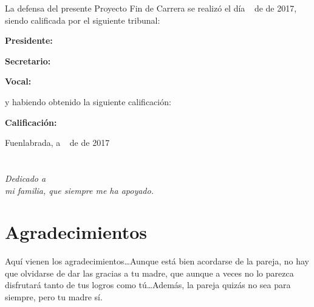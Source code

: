 \documentclass[a4paper, 12pt]{book}
\begin{document}
\vspace{1cm}
La defensa del presente Proyecto Fin de Carrera se realizó el día \qquad$\;\,$ de \qquad\qquad\qquad\qquad \newline de 2017, siendo calificada por el siguiente tribunal:


\vspace{0.5cm}
\textbf{Presidente:}

\vspace{1.2cm}
\textbf{Secretario:}

\vspace{1.2cm}
\textbf{Vocal:}


\vspace{1.2cm}
y habiendo obtenido la siguiente calificación:

\vspace{1cm}
\textbf{Calificación:}


\vspace{1cm}
\begin{flushright}
Fuenlabrada, a \qquad$\;\,$ de \qquad\qquad\qquad\qquad de 2017
\end{flushright}


\chapter*{}
\begin{flushright}
\textit{Dedicado a \\
mi familia, que siempre me ha apoyado.}
\end{flushright}


\chapter*{Agradecimientos}

Aquí vienen los agradecimientos\ldots Aunque está bien acordarse de la pareja,
no hay que olvidarse de dar las gracias a tu madre, que aunque a veces no lo 
parezca disfrutará tanto de tus logros como tú\ldots Además, la pareja quizás
no sea para siempre, pero tu madre sí.
\end{document}

